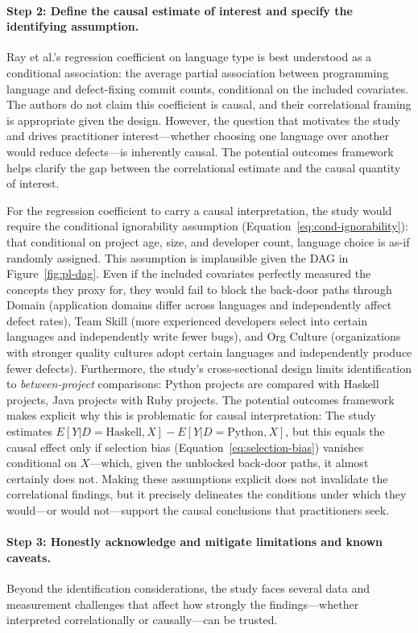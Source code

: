 \paragraph{Step 2: Define the causal estimate of interest and specify the identifying assumption.}
Ray et al.'s regression coefficient on language type is best understood as a conditional association: the average partial association between programming language and defect-fixing commit counts, conditional on the included covariates.
The authors do not claim this coefficient is causal, and their correlational framing is appropriate given the design.
However, the question that motivates the study and drives practitioner interest---whether choosing one language over another would reduce defects---is inherently causal.
The potential outcomes framework helps clarify the gap between the correlational estimate and the causal quantity of interest.

For the regression coefficient to carry a causal interpretation, the study would require the conditional ignorability assumption (Equation~\eqref{eq:cond-ignorability}): that conditional on project age, size, and developer count, language choice is as-if randomly assigned.
This assumption is implausible given the DAG in Figure~\ref{fig:pl-dag}.
Even if the included covariates perfectly measured the concepts they proxy for, they would fail to block the back-door paths through Domain (application domains differ across languages and independently affect defect rates), Team Skill (more experienced developers select into certain languages and independently write fewer bugs), and Org Culture (organizations with stronger quality cultures adopt certain languages and independently produce fewer defects).
Furthermore, the study's cross-sectional design limits identification to \emph{between-project} comparisons: Python projects are compared with Haskell projects, Java projects with Ruby projects.
The potential outcomes framework makes explicit why this is problematic for causal interpretation: The study estimates $E[Y | D = \text{Haskell}, X] - E[Y | D = \text{Python}, X]$, but this equals the causal effect only if selection bias (Equation~\eqref{eq:selection-bias}) vanishes conditional on $X$---which, given the unblocked back-door paths, it almost certainly does not.
Making these assumptions explicit does not invalidate the correlational findings, but it precisely delineates the conditions under which they would---or would not---support the causal conclusions that practitioners seek.

\paragraph{Step 3: Honestly acknowledge and mitigate limitations and known caveats.}
Beyond the identification considerations, the study faces several data and measurement challenges that affect how strongly the findings---whether interpreted correlationally or causally---can be trusted.

